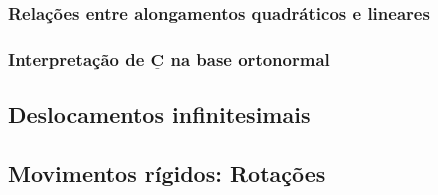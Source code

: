 		\subsubsection{Relações entre alongamentos quadráticos e lineares}
			
	
		\subsubsection{Interpretação de $\underline{\mathbf{C}}$ na base ortonormal}
			
	
	\subsection{Deslocamentos infinitesimais}
		
	
	\subsection{Movimentos rígidos: Rotações}
		